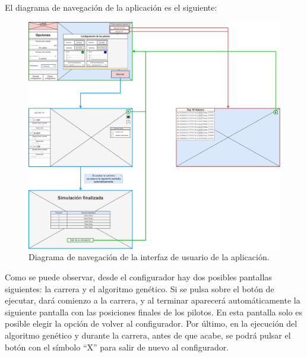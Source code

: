 
El diagrama de navegación de la aplicación es el siguiente:

\begin{figure}[H]
    \centering
    \includegraphics[width=\textwidth]{imagenes/nav.png}
    \caption{Diagrama de navegación de la interfaz de usuario de la aplicación.}
\end{figure}

Como se puede observar, desde el configurador hay dos posibles pantallas siguientes: la carrera y el algoritmo genético. Si se pulsa sobre el botón de ejecutar, dará comienzo a la carrera, y al terminar aparecerá automáticamente la siguiente pantalla con las posiciones finales de los pilotos. En esta pantalla solo es posible elegir la opción de volver al configurador. Por último, en la ejecución del algoritmo genético y durante la carrera, antes de que acabe, se podrá pulsar el botón con el símbolo ``X'' para salir de nuevo al configurador.

